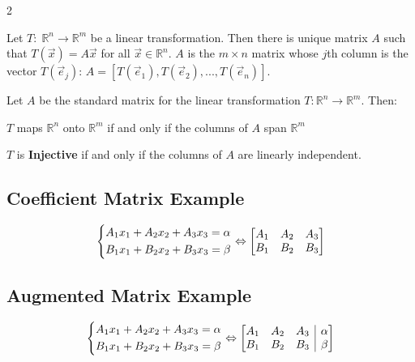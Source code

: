 \documentclass[5pt]{article}
\makeatletter
\newenvironment{amatrix}[1]{%
  \left[\begin{array}{@{}*{#1}{c}|c@{}}
}{%
  \end{array}\right]
}
\makeatother
\begin{document}
\begin{multicols}{2}
\begin{theorem}
  Let $T:\;\mathbb{R}^n\rightarrow\mathbb{R}^m$ be a linear transformation. Then there is unique matrix $A$ such that $T(\vec{x})=A\vec{x}$ for all $\vec{x}\in\mathbb{R}^n$.
  $A$ is the $m\times n$ matrix whose $j$th column is the vector $T(\vec{e}_j)$: $A=\left[T(\vec{e}_1), T(\vec{e}_2), ...,T(\vec{e}_n)\right]$.
\end{theorem}

\begin{theorem}
  Let $A$ be the standard matrix for the linear transformation $T:\mathbb{R}^n\rightarrow\mathbb{R}^m$. Then:
  \begin{itemize*}
    \item $T$ maps $\mathbb{R}^n$ onto $\mathbb{R}^m$ if and only if the columns of $A$ span $\mathbb{R}^m$
    \item $T$ is \textbf{Injective} if and only if the columns of $A$ are linearly independent.
  \end{itemize*}
\end{theorem}

\subsection{Coefficient Matrix Example}
\small{
\begin{equation}
\centering
\left\{\begin{split}
A_1x_1+A_2x_2+A_3x_3=\alpha \\
B_1x_1+B_2x_2+B_3x_3=\beta \\
\end{split}\right.
\Leftrightarrow
\begin{bmatrix}
    A_1 & A_2 & A_3\\
    B_1 & B_2 & B_3\\
\end{bmatrix}
\end{equation}}

\subsection{Augmented Matrix Example}
\small{
\begin{equation}
\left\{\begin{split}
A_1x_1+A_2x_2+A_3x_3=\alpha \\
B_1x_1+B_2x_2+B_3x_3=\beta \\
\end{split}\right.
\Leftrightarrow
\begin{amatrix}{3}
    A_1 & A_2 & A_3 & \alpha \\
    B_1 & B_2 & B_3 & \beta \\
 \end{amatrix}
\end{equation}}


\end{multicols}
\end{document}

